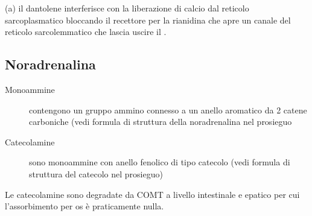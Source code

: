 (a) il dantolene interferisce con la liberazione di calcio dal reticolo sarcoplasmatico bloccando il recettore per la rianidina che apre un canale del reticolo sarcolemmatico che lascia uscire il .

\subsection{Noradrenalina}

\begin{description}
\item[Monoammine] contengono un gruppo ammino connesso a un anello aromatico da 2 catene carboniche (vedi formula di struttura della noradrenalina nel prosieguo
\item[Catecolamine] sono monoammine con anello fenolico di tipo catecolo (vedi formula di struttura del catecolo nel prosieguo)
\end{description}




Le catecolamine sono degradate da COMT a livello intestinale e epatico per cui l'assorbimento per os \`e praticamente nulla.

